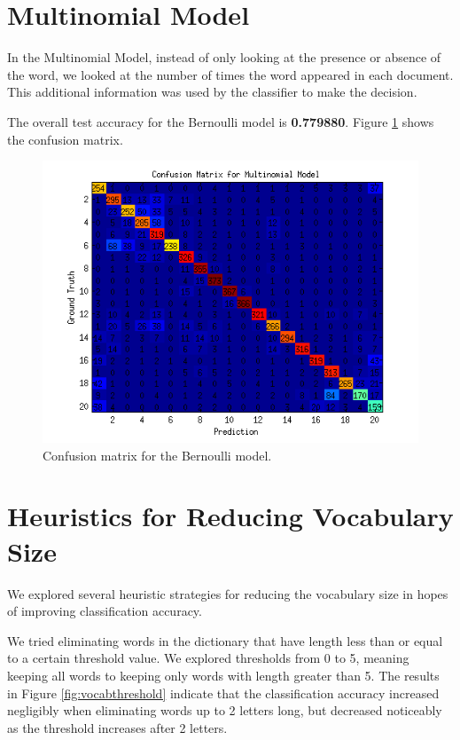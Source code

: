 \documentclass[12pt]{article}
\begin{document}
\section{Multinomial Model}

In the Multinomial Model, instead of only looking at the presence or absence of the word, we looked at the number of times the word appeared in each document. This additional information was used by the classifier to make the decision.

The overall test accuracy for the Bernoulli model is \textbf{0.779880}. Figure \ref{fig:confusionmat_multi} shows the confusion matrix.


\begin{figure}[!t]
  \centering
  \includegraphics[scale=1]{img/confusionmat_multi.png}
  \caption{Confusion matrix for the Bernoulli model.}
  \label{fig:confusionmat_multi}
\end{figure}

\section{Heuristics for Reducing Vocabulary Size}

We explored several heuristic strategies for reducing the vocabulary size in hopes of improving classification accuracy.

We tried eliminating words in the dictionary that have length less than  or equal to a certain threshold value. We explored thresholds from 0 to 5, meaning keeping all words to keeping only words with length greater than 5. The results in Figure \ref{fig:vocabthreshold} indicate that the classification accuracy increased negligibly when eliminating words up to 2 letters long, but decreased noticeably as the threshold increases after 2 letters.
\end{document}

